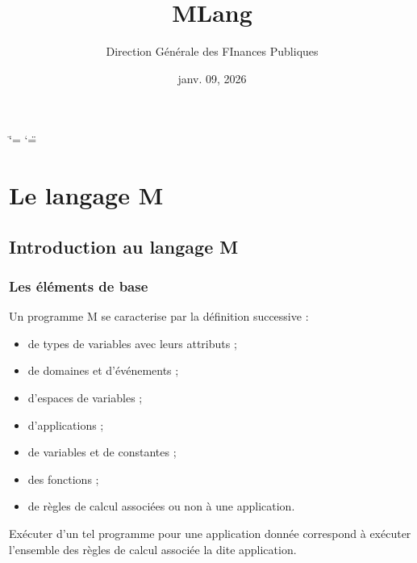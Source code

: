 \documentclass[letterpaper,10pt,french]{sphinxmanual}
\title{MLang}
\date{janv. 09, 2026}
\author{Direction Générale des FInances Publiques}
\begin{document}
\ifdefined\shorthandoff
  \ifnum\catcode`\=\string=\active\shorthandoff{=}\fi
  \ifnum\catcode`\"=\active{}\fi
\fi

\pagestyle{empty}
\sphinxmaketitle
\pagestyle{plain}
\sphinxtableofcontents
\pagestyle{normal}
\label{\detokenize{index::doc}}





\chapter{Le langage M}
\label{\detokenize{index:le-langage-m}}
\sphinxstepscope


\section{Introduction au langage M}
\label{\detokenize{intro:introduction-au-langage-m}}\label{\detokenize{intro:intro-m}}\label{\detokenize{intro::doc}}

\subsection{Les éléments de base}
\label{\detokenize{intro:les-elements-de-base}}
\sphinxAtStartPar
Un programme M se caracterise par la définition successive :
\begin{itemize}
\item {} 
\sphinxAtStartPar
de types de variables avec leurs attributs ;

\item {} 
\sphinxAtStartPar
de domaines et d’événements ;

\item {} 
\sphinxAtStartPar
d’espaces de variables ;

\item {} 
\sphinxAtStartPar
d’applications ;

\item {} 
\sphinxAtStartPar
de variables et de constantes ;

\item {} 
\sphinxAtStartPar
des fonctions ;

\item {} 
\sphinxAtStartPar
de règles de calcul associées ou non à une application.

\end{itemize}

\sphinxAtStartPar
Exécuter d’un tel programme pour une application donnée correspond à
exécuter l’ensemble des règles de calcul associée la dite application.
\end{document}
